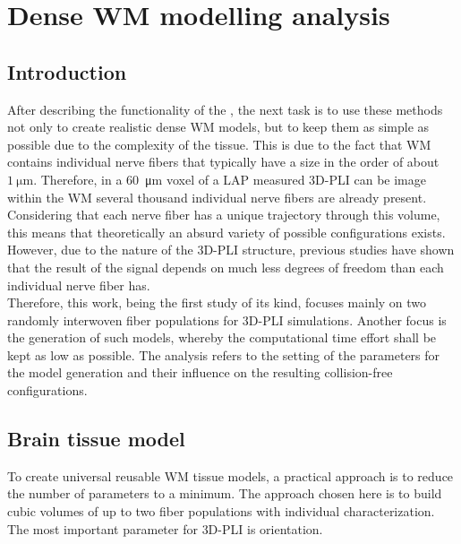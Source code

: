 \setcounter{chapter}{6}
\chapter{Dense \acs{WM} modelling analysis}
\label{cha:model_analysis}
% 
% 
% 
\section{Introduction}
% 
After describing the functionality of the , the next task is to use these methods not only to create realistic dense \ac{WM} models, but to keep them as simple as possible due to the complexity of the tissue.
This is due to the fact that \ac{WM} contains individual nerve fibers that typically have a size in the order of about $\SI{1}{\micro\meter}$.
Therefore, in a \SI{60}{\micro\meter} voxel of a \ac{LAP} measured \ac{3D-PLI} can be image within the \ac{WM} several thousand individual nerve fibers are already present.
Considering that each nerve fiber has a unique trajectory through this volume, this means that theoretically an absurd variety of possible configurations exists.
However, due to the nature of the \ac{3D-PLI} structure, previous studies have shown that the result of the signal depends on much less degrees of freedom than each individual nerve fiber has.
\\[\baselineskip]
% 
Therefore, this work, being the first study of its kind, focuses mainly on two randomly interwoven fiber populations for \ac{3D-PLI} simulations.
Another focus is the generation of such models, whereby the computational time effort shall be kept as low as possible.
The analysis refers to the setting of the parameters for the model generation and their influence on the resulting collision-free configurations.
% 
% 
\section{Brain tissue model}
% 
To create universal reusable \ac{WM} tissue models, a practical approach is to reduce the number of parameters to a minimum.
The approach chosen here is to build cubic volumes of up to two fiber populations with individual characterization.
The most important parameter for \ac{3D-PLI} is orientation.
% 
